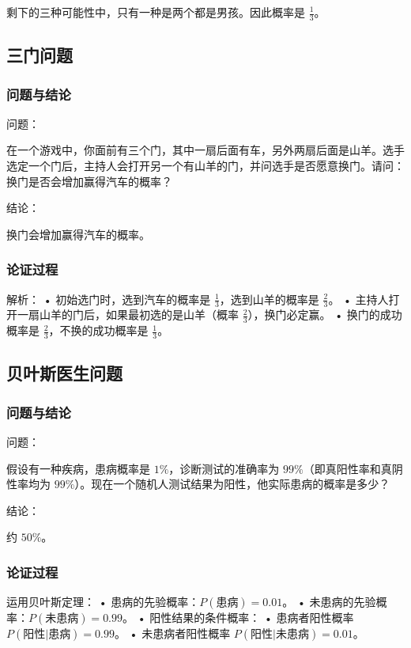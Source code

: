 剩下的三种可能性中，只有一种是两个都是男孩。因此概率是 $\frac{1}{3}$。

\subsection{三门问题}

\subsubsection{问题与结论}

问题：

在一个游戏中，你面前有三个门，其中一扇后面有车，另外两扇后面是山羊。选手选定一个门后，主持人会打开另一个有山羊的门，并问选手是否愿意换门。请问：换门是否会增加赢得汽车的概率？

结论：

换门会增加赢得汽车的概率。

\subsubsection{论证过程}


解析：
	•	初始选门时，选到汽车的概率是 $\frac{1}{3}$，选到山羊的概率是 $\frac{2}{3}$。
	•	主持人打开一扇山羊的门后，如果最初选的是山羊（概率 $\frac{2}{3}$），换门必定赢。
	•	换门的成功概率是 $\frac{2}{3}$，不换的成功概率是 $\frac{1}{3}$。

\subsection{贝叶斯医生问题}

\subsubsection{问题与结论}

问题：

假设有一种疾病，患病概率是 $1\%$，诊断测试的准确率为 $99\%$（即真阳性率和真阴性率均为 $99\%$）。现在一个随机人测试结果为阳性，他实际患病的概率是多少？

结论：

约 $50\%$。

\subsubsection{论证过程}
    
运用贝叶斯定理：
	•	患病的先验概率：$P(\text{患病}) = 0.01$。
	•	未患病的先验概率：$P(\text{未患病}) = 0.99$。
	•	阳性结果的条件概率：
	•	患病者阳性概率 $P(\text{阳性}|\text{患病}) = 0.99$。
	•	未患病者阳性概率 $P(\text{阳性}|\text{未患病}) = 0.01$。

